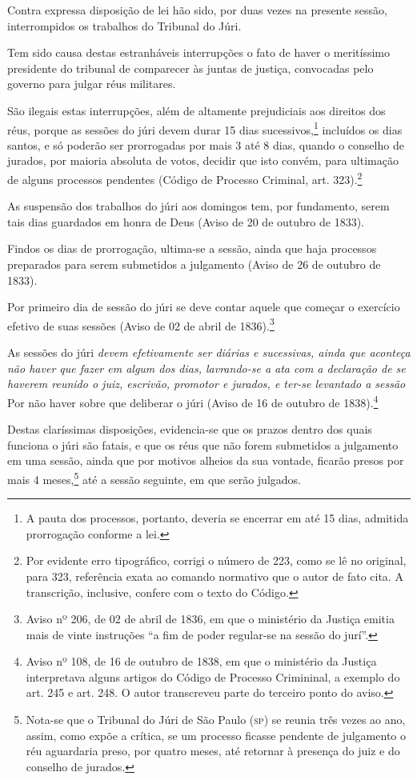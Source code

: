 Contra expressa disposição de lei hão sido, por duas vezes na presente
sessão, interrompidos os trabalhos do Tribunal do Júri.

Tem sido causa destas estranháveis interrupções o fato de haver o
meritíssimo presidente do tribunal de comparecer às juntas de justiça,
convocadas pelo governo para julgar réus militares.

São ilegais estas interrupções, além de altamente prejudiciais aos
direitos dos réus, porque as sessões do júri devem durar 15 dias
sucessivos,\footnote{A pauta dos processos, portanto, deveria se
  encerrar em até 15 dias, admitida prorrogação conforme a lei.}
incluídos os dias santos, e só poderão ser prorrogadas por mais 3 até 8
dias, quando o conselho de jurados, por maioria absoluta de votos,
decidir que isto convém, para ultimação de alguns processos pendentes
(Código de Processo Criminal, art. 323).\footnote{Por evidente erro
  tipográfico, corrigi o número de 223, como se lê no original, para
  323, referência exata ao comando normativo que o autor de fato cita. A
  transcrição, inclusive, confere com o texto do Código.}

As suspensão dos trabalhos do júri aos domingos tem, por fundamento,
serem tais dias guardados em honra de Deus (Aviso de 20 de outubro de
1833).

Findos os dias de prorrogação, ultima-se a sessão, ainda que haja
processos preparados para serem submetidos a julgamento (Aviso de 26 de
outubro de 1833).

Por primeiro dia de sessão do júri se deve contar aquele que começar o
exercício efetivo de suas sessões (Aviso de 02 de abril de
1836).\footnote{Aviso nº 206, de 02 de abril de 1836, em que o ministério da
  Justiça emitia mais de vinte instruções ``a fim de poder regular-se na
  sessão do jurí''.}

As sessões do júri \emph{devem efetivamente ser diárias e sucessivas,
ainda que aconteça não haver que fazer em algum dos dias, lavrando-se a
ata com a declaração de se haverem reunido o juiz, escrivão, promotor e
jurados, e ter-se levantado a sessão} Por não haver sobre que deliberar
o júri (Aviso de 16 de outubro de 1838).\footnote{Aviso nº 108, de
  16 de outubro de 1838, em que o ministério da Justiça interpretava alguns artigos
  do Código de Processo Crimininal, a exemplo do art. 245 e art. 248. O
  autor transcreveu parte do terceiro ponto do aviso.}

Destas claríssimas disposições, evidencia-se que os prazos dentro dos
quais funciona o júri são fatais, e que os réus que não forem submetidos
a julgamento em uma sessão, ainda que por motivos alheios da sua
vontade, ficarão presos por mais 4 meses,\footnote{Nota-se que o
  Tribunal do Júri de São Paulo (\textsc{sp}) se reunia três vezes ao ano, assim,
  como expõe a crítica, se um processo ficasse pendente de julgamento o
  réu aguardaria preso, por quatro meses, até retornar à presença do
  juiz e do conselho de jurados.} até a sessão seguinte, em que serão
julgados.

